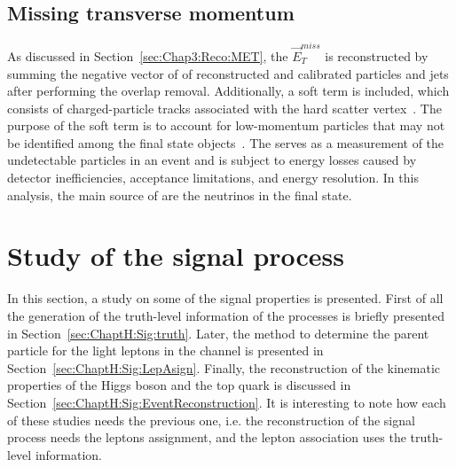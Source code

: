 %
%
\subsection{Missing transverse momentum}
As discussed in Section~\ref{sec:Chap3:Reco:MET}, the $\overrightarrow{E}_{T}^{miss}$ is reconstructed by summing the 
negative vector of \pT of reconstructed and calibrated particles and 
jets after performing the overlap removal. %
Additionally, a soft term is included, which consists of charged-particle tracks associated 
with the hard scatter vertex~\cite{PERF-2016-07, ATLAS-CONF-2018-023}. The purpose of
the soft term is to account for low-momentum particles that may not be identified among the 
final state objects~\cite{PERF-2011-07, PERF-2014-04, ATL-PHYS-PUB-2015-027}. 
The \MET serves as a measurement of the undetectable particles in an event and is subject to 
energy losses caused by detector inefficiencies, acceptance limitations, and energy resolution.
In this analysis, the main source of \MET are the neutrinos in the final state.

\section{Study of the \tHq signal process}
\label{sec:ChaptH:Sig}
In this section, a study on some of the signal properties is presented.
First of all the generation of the truth-level information of the \tHq processes
is briefly presented in Section~\ref{sec:ChaptH:Sig:truth}. Later, the method to 
determine the parent particle for the light leptons in the \dilepSStau channel
is presented in Section~\ref{sec:ChaptH:Sig:LepAsign}. Finally, the reconstruction
of the kinematic properties of the Higgs boson and the top quark is discussed 
in Section~\ref{sec:ChaptH:Sig:EventReconstruction}.
It is interesting to note how each of these studies needs the previous one, i.e.
the reconstruction of the signal process needs the leptons assignment, and
the lepton association uses the truth-level information.



